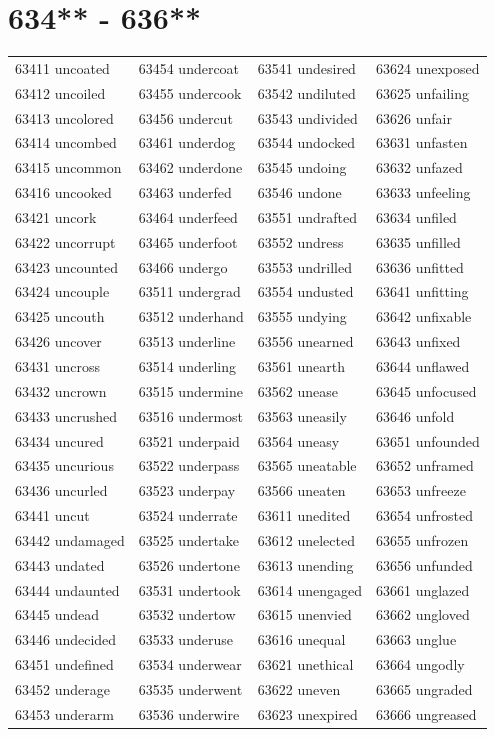 \documentclass[10pt, oneside]{book}
\begin{document}
\begin{table}
	\centering
	\section*{634** - 636**}
	\begin{tabular}{l l l l}
63411 uncoated &63454 undercoat &63541 undesired &63624 unexposed\\
63412 uncoiled &63455 undercook &63542 undiluted &63625 unfailing\\
63413 uncolored &63456 undercut &63543 undivided &63626 unfair\\
63414 uncombed &63461 underdog &63544 undocked &63631 unfasten\\
63415 uncommon &63462 underdone &63545 undoing &63632 unfazed\\
63416 uncooked &63463 underfed &63546 undone &63633 unfeeling\\
63421 uncork &63464 underfeed &63551 undrafted &63634 unfiled\\
63422 uncorrupt &63465 underfoot &63552 undress &63635 unfilled\\
63423 uncounted &63466 undergo &63553 undrilled &63636 unfitted\\
63424 uncouple &63511 undergrad &63554 undusted &63641 unfitting\\
63425 uncouth &63512 underhand &63555 undying &63642 unfixable\\
63426 uncover &63513 underline &63556 unearned &63643 unfixed\\
63431 uncross &63514 underling &63561 unearth &63644 unflawed\\
63432 uncrown &63515 undermine &63562 unease &63645 unfocused\\
63433 uncrushed &63516 undermost &63563 uneasily &63646 unfold\\
63434 uncured &63521 underpaid &63564 uneasy &63651 unfounded\\
63435 uncurious &63522 underpass &63565 uneatable &63652 unframed\\
63436 uncurled &63523 underpay &63566 uneaten &63653 unfreeze\\
63441 uncut &63524 underrate &63611 unedited &63654 unfrosted\\
63442 undamaged &63525 undertake &63612 unelected &63655 unfrozen\\
63443 undated &63526 undertone &63613 unending &63656 unfunded\\
63444 undaunted &63531 undertook &63614 unengaged &63661 unglazed\\
63445 undead &63532 undertow &63615 unenvied &63662 ungloved\\
63446 undecided &63533 underuse &63616 unequal &63663 unglue\\
63451 undefined &63534 underwear &63621 unethical &63664 ungodly\\
63452 underage &63535 underwent &63622 uneven &63665 ungraded\\
63453 underarm &63536 underwire &63623 unexpired &63666 ungreased\\
	\end{tabular}
 \end{table}
\clearpage
\end{document}
